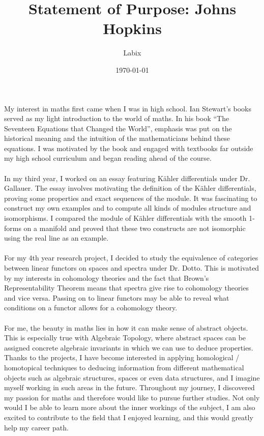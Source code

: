 \documentclass[a4paper]{article}
\title{Statement of Purpose: Johns Hopkins}
\author{Labix}
\date{\today}
\begin{document}
My interest in maths first came when I was in high school. Ian Stewart’s books served as my light introduction to the world of maths. In his book “The Seventeen Equations that Changed the World”, emphasis was put on the historical meaning and the intuition of the mathematicians behind these equations. I was motivated by the book and engaged with textbooks far outside my high school curriculum and began reading ahead of the course. \\~\\

In my third year, I worked on an essay featuring Kähler differentials under Dr. Gallauer. The essay involves motivating the definition of the Kähler differentials, proving some properties and exact sequences of the module. It was fascinating to construct my own examples and to compute all kinds of modules structure and isomorphisms. I compared the module of Kähler differentials with the smooth 1-forms on a manifold and proved that these two constructs are not isomorphic using the real line as an example. \\~\\

For my 4th year research project, I decided to study the equivalence of categories between linear functors on spaces and spectra under Dr. Dotto. This is motivated by my interests in cohomology theories and the fact that Brown’s Representability Theorem means that spectra give rise to cohomology theories and vice versa. Passing on to linear functors may be able to reveal what conditions on a functor allows for a cohomology theory. \\~\\

For me, the beauty in maths lies in how it can make sense of abstract objects. This is especially true with Algebraic Topology, where abstract spaces can be assigned concrete algebraic invariants in which we can use to deduce properties. Thanks to the projects, I have become interested in applying homological / homotopical techniques to deducing information from different mathematical objects such as algebraic structures, spaces or even data structures, and I imagine myself working in such areas in the future. Throughout my journey, I discovered my passion for maths and therefore would like to pursue further studies. Not only would I be able to learn more about the inner workings of the subject, I am also excited to contribute to the field that I enjoyed learning, and this would greatly help my career path. \\~\\
\end{document}
